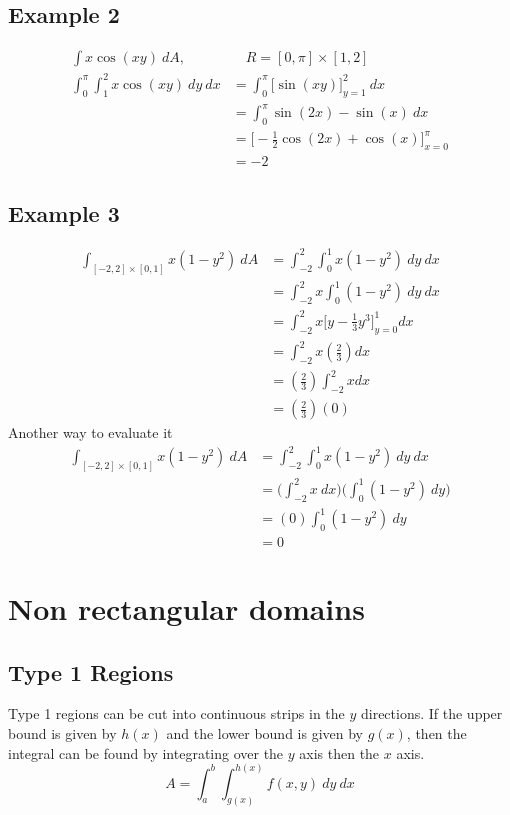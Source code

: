 \documentclass{article}
\theoremstyle{mytheoremstyle}
\theoremstyle{mytheoremstyle}
\theoremstyle{myproblemstyle}
\begin{document}
    \subsection*{Example 2}
    \begin{align*}
        \int x\cos(xy) \ dA,&\quad R=[0,\pi]\times [1,2] \\
        \int_{0}^{\pi} \int_{1}^{2} x\cos(xy) \ dy \ dx
        &= \int_{0}^{\pi} \Big[\sin(xy)\Big]_{y=1}^2 \ dx \\
        &= \int_{0}^{\pi} \sin(2x) - \sin(x) \ dx \\
        &= \Big[ -\frac{1}{2} \cos(2x) + \cos(x)\Big]_{x=0}^\pi \\
        &= -2
    \end{align*}

    \subsection*{Example 3}
    \begin{align*}
        \int_{[-2,2]\times[0,1]} x(1-y^2)\ dA
        &= \int_{-2}^2 \int_0^1 x(1-y^2)\ dy\ dx \\
        &= \int_{-2}^2 x\int_0^1 (1-y^2)\ dy\ dx \\
        &= \int_{-2}^2 x \Big[y - \frac{1}{3} y^3\Big]_{y=0}^1 dx \\
        &= \int_{-2}^2 x (\frac{2}{3}) dx \\
        &= (\frac{2}{3}) \int_{-2}^2 x dx \\
        &= (\frac{2}{3}) (0)
    \end{align*}
    Another way to evaluate it
    \begin{align*}
        \int_{[-2,2]\times[0,1]} x(1-y^2)\ dA
        &= \int_{-2}^2 \int_0^1 x(1-y^2)\ dy\ dx \\
        &= \Big(\int_{-2}^2 x\ dx\Big) \Big(\int_0^1 (1-y^2)\ dy\Big)\\
        &= (0) \int_0^1 (1-y^2)\ dy\\
        &= 0
    \end{align*}

    \section*{Non rectangular domains}
    \subsection*{Type 1 Regions}
    Type 1 regions can be cut into continuous strips in the $y$ directions. If
    the upper bound is given by $h(x)$ and the lower bound is given by $g(x)$,
    then the integral can be found by integrating over the $y$ axis then the $x$
    axis.
    \[
        A = \int_{a}^{b} \int_{g(x)}^{h(x)} f(x,y) \ dy \ dx
    \]
\end{document}
